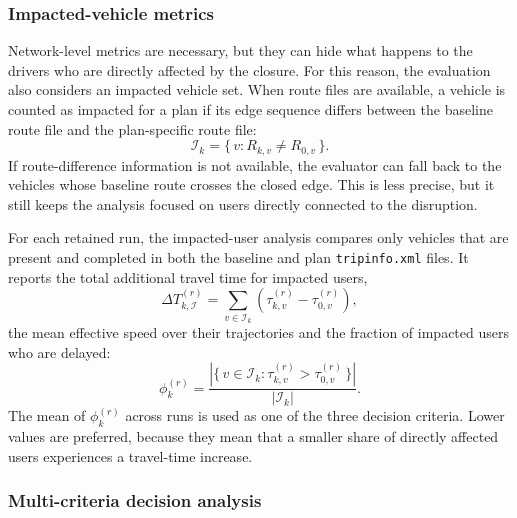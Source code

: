 \subsubsection{Impacted-vehicle metrics}
\label{sssec:evaluator_impacted_users}

Network-level metrics are necessary, but they can hide what happens to the
drivers who are directly affected by the closure. For this reason, the
evaluation also considers an impacted vehicle set. When route files are
available, a vehicle is counted as impacted for a plan if its edge sequence
differs between the baseline route file and the plan-specific route file:
\begin{equation}
  \mathcal{I}_k =
  \{\,v : R_{k,v} \neq R_{0,v}\,\}.
  \label{eq:evaluator_impacted_set}
\end{equation}
If route-difference information is not available, the evaluator can fall back
to the vehicles whose baseline route crosses the closed edge. This is less
precise, but it still keeps the analysis focused on users directly connected
to the disruption.

For each retained run, the impacted-user analysis compares only vehicles that
are present and completed in both the baseline and plan \texttt{tripinfo.xml}
files. It reports the total additional travel time for impacted users,
\begin{equation}
  \Delta T_{k,\mathcal{I}}^{(r)}
  =
  \sum_{v \in \mathcal{I}_k}
  \left(\tau_{k,v}^{(r)} - \tau_{0,v}^{(r)}\right),
  \label{eq:evaluator_impacted_delta_time}
\end{equation}
the mean effective speed over their trajectories and the fraction of impacted
users who are delayed:
\begin{equation}
  \phi_k^{(r)}
  =
  \frac{
    |\{\,v \in \mathcal{I}_k :
      \tau_{k,v}^{(r)} > \tau_{0,v}^{(r)}\,\}|
  }{
    |\mathcal{I}_k|
  }.
  \label{eq:evaluator_phi}
\end{equation}
The mean of $\phi_k^{(r)}$ across runs is used as one of the three decision
criteria. Lower values are preferred, because they mean that a smaller share
of directly affected users experiences a travel-time increase.

\subsubsection{Multi-criteria decision analysis}
\label{sssec:evaluator_mcda}

